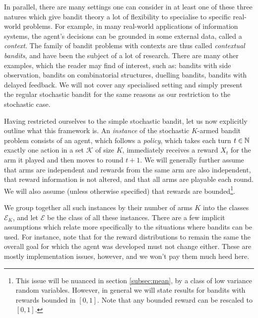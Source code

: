 \par In parallel, there are many settings one can consider in at least one of these three natures which give bandit theory a lot of flexibility to specialise to specific real-world problems. For example, in many real-world applications of information systems, the agent's decisions can be grounded in some external data, called a {\em context}. The family of bandit problems with contexts are thus called {\em contextual bandits}, and have been the subject of a lot of research\cite{banditalgs:11}. There are many other examples, which the reader may find of interest, such as: bandits with side observation\cite{mannor:2011}, bandits on combinatorial structures\cite{kveton:2014}, duelling bandits\cite{yue:2009}, bandits with delayed feedback\cite{dudik:2011}. We will not cover any specialised setting and simply present the regular stochastic bandit for the same reasons as our restriction to the stochastic case. 

\par Having restricted ourselves to the simple stochastic bandit, let us now explicitly outline what this framework is. An {\em instance} of the stochastic $K$-armed bandit problem consists of an agent, which follows a {\em policy}, which takes each turn $t\in\mathbb{N}$ exactly one action in a set $\mathcal{K}$ of size $K$, immediately receives a reward $X_t$ for the arm it played and then moves to round $t+1$. We will generally further assume that arms are independent and rewards from the same arm are also independent, that reward information is not altered, and that all arms are playable each round. We will also assume (unless otherwise specified) that rewards are bounded\footnote{This issue will be nuanced in section \ref{subsec:mean}, by a class of low variance random variables. However, in general we will state results for bandits with rewards bounded in $[0,1]$. Note that any bounded reward can be rescaled to $[0,1]$.}.
\par We group together all such instances by their number of arms $K$ into the classes $\mathcal{E}_K$, and let $\mathcal{E}$ be the class of all these instances. There are a few implicit assumptions which relate more specifically to the situations where bandits can be used. For instance, note that for the reward distributions to remain the same the overall goal for which the agent was developed must not change either. These are mostly implementation issues, however, and we won't pay them much heed here. 


